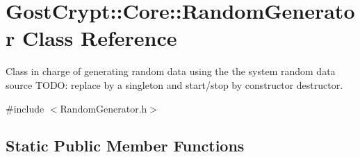 \hypertarget{class_gost_crypt_1_1_core_1_1_random_generator}{}\section{Gost\+Crypt\+:\+:Core\+:\+:Random\+Generator Class Reference}
\label{class_gost_crypt_1_1_core_1_1_random_generator}


Class in charge of generating random data using the the system random data source T\+O\+DO\+: replace by a singleton and start/stop by constructor destructor.  




{\ttfamily \#include $<$Random\+Generator.\+h$>$}

\subsection*{Static Public Member Functions}
